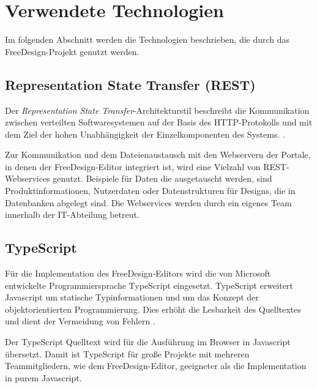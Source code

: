 
\section{Verwendete Technologien}
Im folgenden Abschnitt werden die Technologien beschrieben, die durch das FreeDesign-Projekt genutzt werden. 

\subsection{Representation State Transfer (REST)}
Der \emph{Representation State Transfer}-Architekturstil beschreibt die Kommunikation zwischen verteilten Softwaresystemen auf der Basis des HTTP-Protokolls und mit dem Ziel der hohen Unabhängigkeit der Einzelkomponenten des Systems. \autocite[vgl.][105-106]{Fielding2000}.

Zur Kommunikation und dem Dateienaustausch mit den Webservern der Portale, in denen der FreeDesign-Editor integriert ist, wird eine Vielzahl von REST-Webservices genutzt. 
Beispiele für Daten die ausgetauscht werden, sind Produktinformationen, Nutzerdaten oder Datenstrukturen für Designs, die in Datenbanken abgelegt sind.
Die Webservices werden durch ein eigenes Team innerhalb der IT-Abteilung betreut.  

\subsection{TypeScript}
Für die Implementation des FreeDesign-Editors wird die von Microsoft entwickelte Programmiersprache TypeScript eingesetzt. TypeScript erweitert Javascript um statische Typinformationen und um das Konzept der objektorientierten Programmierung. Dies erhöht die Lesbarkeit des Quelltextes und dient der Vermeidung von Fehlern \autocite[vgl.][S. 111]{Zeigermann2014}. 

Der TypeScript Quelltext wird für die Ausführung im Browser in Javascript übersetzt. Damit ist TypeScript für große Projekte mit mehreren Teammitgliedern, wie dem FreeDesign-Editor, geeigneter als die Implementation in purem Javascript.

